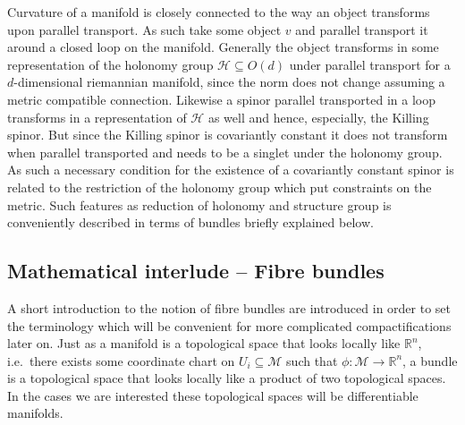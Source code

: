 Curvature of a manifold is closely connected to the way an object transforms upon parallel transport. As such take some object $v$ and parallel transport it around a closed loop on the manifold. Generally the object transforms in some representation of the holonomy group $\mathscr{H}\subseteq O(d)$ under parallel transport for a $d$-dimensional riemannian manifold, since the norm does not change assuming a metric compatible connection. Likewise a spinor parallel transported in a loop transforms in a representation of $\mathscr{H}$ as well and hence, especially, the Killing spinor. But since the Killing spinor is covariantly constant it does not transform when parallel transported and needs to be a singlet under the holonomy group. As such a necessary condition for the existence of a covariantly constant spinor is related to the restriction of the holonomy group which put constraints on the metric. Such features as reduction of holonomy and structure group is conveniently described in terms of bundles briefly explained below.

\subsection{Mathematical interlude -- Fibre bundles}
A short introduction to the notion of fibre bundles are introduced in order to set the terminology which will be convenient for more complicated compactifications later on. Just as a manifold is a topological space that looks locally like $\mathbb{R}^n$, i.e.\ there exists some coordinate chart on $U_i\subseteq \mathcal{M}$ such that $\phi: \mathcal{M}\to \mathbb{R}^n$, a bundle is a topological space that looks locally like a product of two topological spaces. In the cases we are interested these topological spaces will be differentiable manifolds. 

